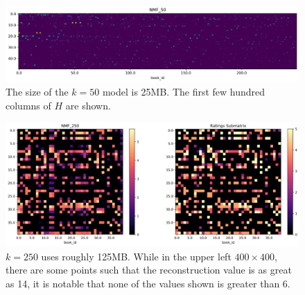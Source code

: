 \documentclass[11pt]{article}
\begin{document}

\begin{figure}[p]
    \includegraphics[width=\linewidth, trim=3cm 0cm 0cm 0cm, clip]{../image/goodreads-models/nmf-H-50.png}
    \caption[NMF-H-50]{The size of the $k=50$ model is 25MB. The first few hundred columns of $H$ are shown.}
     \label{fig:nmf-H-50}
\end{figure}


\begin{figure}[p]
    \includegraphics[width=\linewidth]{../image/goodreads-models/nmf-250-left-close.png}
    \caption[NMF-250-Left-Close]{$k=250$ uses roughly 125MB. While in the upper left $400 \times 400$, there are some points such that
    the reconstruction value is as great as 14, it is notable that none of the values shown is greater than 6.}
     \label{fig:nmf-250-left-close}
\end{figure}
\end{document}
